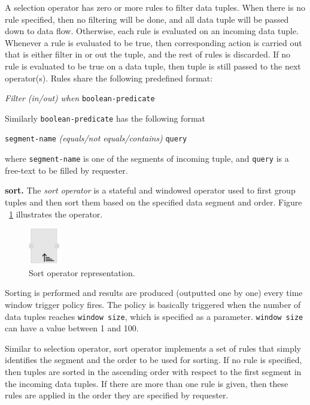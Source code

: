 A selection operator has zero or more rules to filter data tuples. When there is 
no rule specified, then no filtering will be done, and all data tuple will be passed 
down to data flow. Otherwise, each rule is evaluated on an incoming data tuple. 
Whenever a rule is evaluated to be true, then corresponding action is carried out 
that is either filter in or out the tuple, and the rest of rules is discarded. If no rule is 
evaluated to be true on a data tuple, then tuple is still passed to the next operator(s). 
Rules share the following predefined format:

\textit{Filter} \textit{(in/out)} \textit{when} \texttt{boolean-predicate}

Similarly \texttt{boolean-predicate} has the following format

\texttt{segment-name} \textit{(equals/not equals/contains)} \texttt{query}

where \texttt{segment-name} is one of the segments of incoming tuple, 
and \texttt{query} is a free-text to be filled by requester.

\textbf{sort.}
The \textit{sort operator} is a stateful and windowed operator used to first group 
tuples and then sort them based on the specified data segment and order. Figure
~\ref{fig:sort operator} illustrates the operator.

\begin{figure}[ht]
	\centering
	\includegraphics[height=60px]{figures/SortOperator.pdf}
	\caption{Sort operator representation.}
	\label{fig:sort operator}
\end{figure}

Sorting is performed and results are produced (outputted one by one) every time 
window trigger policy fires. The policy is basically triggered when the number of 
data tuples reaches \texttt{window size}, which is specified as a parameter. 
\texttt{window size} can have a value between 1 and 100.

Similar to selection operator, sort operator implements a set of rules that simply 
identifies the segment and the order to be used for sorting. If no rule is specified, 
then tuples are sorted in the ascending order with respect to the first segment in 
the incoming data tuples. If there are more than one rule is given, then these rules 
are applied in the order they are specified by requester.

